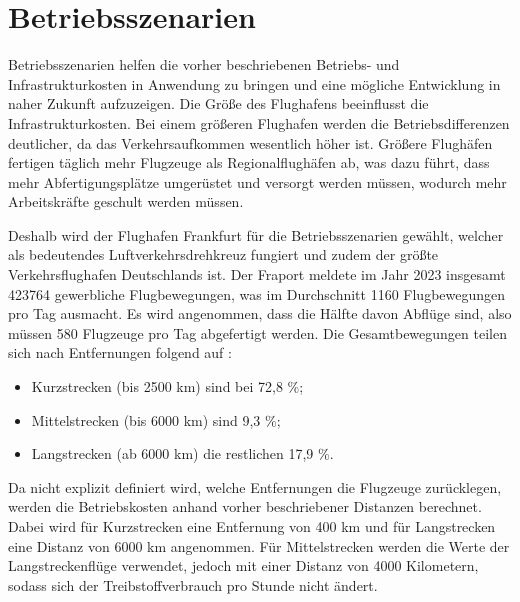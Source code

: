 
\section{Betriebsszenarien}
\label{s:Betriebsszenarien}
Betriebsszenarien helfen die vorher beschriebenen Betriebs- und Infrastrukturkosten 
in Anwendung zu bringen und eine mögliche Entwicklung in naher Zukunft aufzuzeigen. 
Die Größe des Flughafens beeinflusst die Infrastrukturkosten. 
Bei einem größeren Flughafen werden die Betriebsdifferenzen deutlicher, 
da das Verkehrsaufkommen wesentlich höher ist.
Größere Flughäfen fertigen täglich mehr Flugzeuge als Regionalflughäfen ab, 
was dazu führt, dass mehr Abfertigungsplätze umgerüstet und versorgt werden müssen,
wodurch mehr Arbeitskräfte geschult werden müssen.

Deshalb wird der Flughafen Frankfurt für die Betriebsszenarien gewählt,
welcher als bedeutendes Luftverkehrsdrehkreuz fungiert
und zudem der größte Verkehrsflughafen Deutschlands ist.
Der Fraport meldete im Jahr 2023 insgesamt 423764 gewerbliche Flugbewegungen, 
was im Durchschnitt 1160 Flugbewegungen pro Tag ausmacht. 
Es wird angenommen, dass die Hälfte davon Abflüge sind, 
also müssen 580 Flugzeuge pro Tag abgefertigt werden.
%
Die Gesamtbewegungen teilen sich nach Entfernungen folgend auf \cite{fraport2023frankfurt}:
\begin{itemize}
    \item Kurzstrecken (bis 2500 km) sind bei 72,8 \%;
    \item Mittelstrecken (bis 6000 km) sind 9,3 \%;
    \item Langstrecken (ab 6000 km) die restlichen 17,9 \%. 
    \end{itemize}
Da nicht explizit definiert wird, welche Entfernungen die Flugzeuge zurücklegen, 
werden die Betriebskosten anhand vorher beschriebener Distanzen berechnet.
Dabei wird für Kurzstrecken eine Entfernung von 400 km 
und für Langstrecken eine Distanz von 6000 km angenommen.
Für Mittelstrecken werden die Werte der Langstreckenflüge verwendet, 
jedoch mit einer Distanz von 4000 Kilometern, 
sodass sich der Treibstoffverbrauch pro Stunde nicht ändert.

